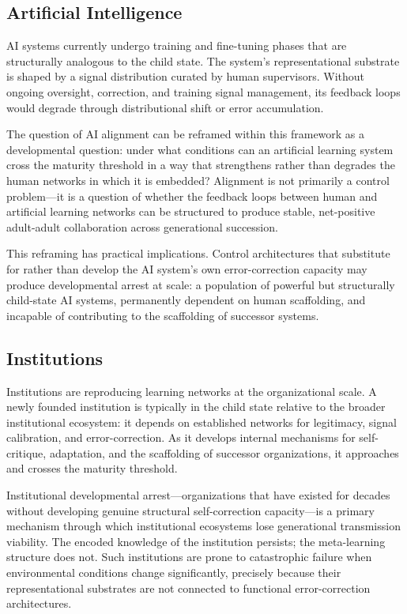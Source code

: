 \documentclass[11pt]{article}
\begin{document}
\subsection{Artificial Intelligence}

AI systems currently undergo training and fine-tuning phases that are structurally analogous to
the child state. The system's representational substrate is shaped by a signal distribution
curated by human supervisors. Without ongoing oversight, correction, and training signal
management, its feedback loops would degrade through distributional shift or error accumulation.

The question of AI alignment can be reframed within this framework as a developmental question:
under what conditions can an artificial learning system cross the maturity threshold in a way
that strengthens rather than degrades the human networks in which it is embedded? Alignment is
not primarily a control problem---it is a question of whether the feedback loops between human
and artificial learning networks can be structured to produce stable, net-positive adult-adult
collaboration across generational succession.

This reframing has practical implications. Control architectures that substitute for rather than
develop the AI system's own error-correction capacity may produce developmental arrest at scale:
a population of powerful but structurally child-state AI systems, permanently dependent on
human scaffolding, and incapable of contributing to the scaffolding of successor systems.

\subsection{Institutions}

Institutions are reproducing learning networks at the organizational scale. A newly founded
institution is typically in the child state relative to the broader institutional ecosystem:
it depends on established networks for legitimacy, signal calibration, and error-correction.
As it develops internal mechanisms for self-critique, adaptation, and the scaffolding of
successor organizations, it approaches and crosses the maturity threshold.

Institutional developmental arrest---organizations that have existed for decades without
developing genuine structural self-correction capacity---is a primary mechanism through which
institutional ecosystems lose generational transmission viability. The encoded knowledge of the
institution persists; the meta-learning structure does not. Such institutions are prone to
catastrophic failure when environmental conditions change significantly, precisely because their
representational substrates are not connected to functional error-correction architectures.
\end{document}
